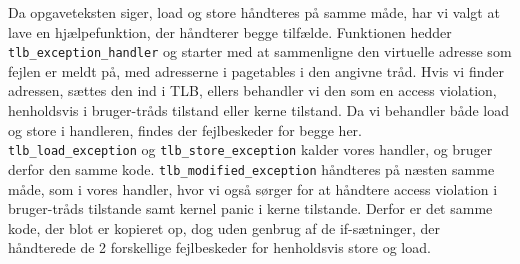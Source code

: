 Da opgaveteksten siger, load og store håndteres på samme måde, har vi valgt at lave en hjælpefunktion, 
der håndterer begge tilfælde. Funktionen hedder \verb+tlb_exception_handler+ og starter med at 
sammenligne den virtuelle adresse som fejlen er meldt på, med adresserne i pagetables i den angivne 
tråd. Hvis vi finder adressen, sættes den ind i TLB, ellers behandler vi den som en access violation, 
henholdsvis i bruger-tråds tilstand eller kerne tilstand. Da vi behandler både load og store i handleren, 
findes der fejlbeskeder for begge her. \\

\noindent \verb+tlb_load_exception+ og \verb+tlb_store_exception+ kalder vores handler, og bruger 
derfor den samme kode. \verb+tlb_modified_exception+ håndteres på næsten samme måde, som i vores 
handler, hvor vi også sørger for at håndtere access violation i bruger-tråds tilstande samt kernel panic i 
kerne tilstande. Derfor er det samme kode, der blot er kopieret op, dog uden genbrug af de if-sætninger, 
der håndterede de 2 forskellige fejlbeskeder for henholdsvis store og load. 